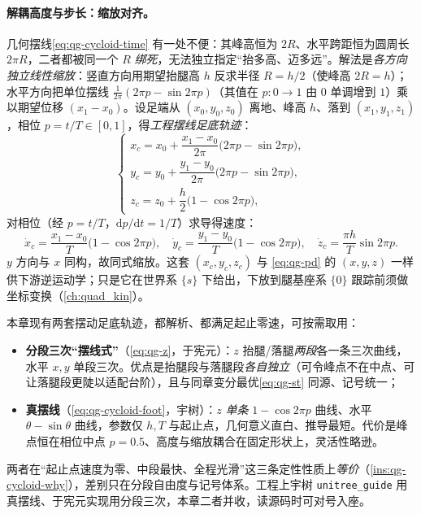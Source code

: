 \paragraph{解耦高度与步长：缩放对齐。}
几何摆线\cref{eq:qg-cycloid-time} 有一处不便：其峰高恒为 $2R$、水平跨距恒为圆周长 $2\pi R$，二者都被同一个 $R$ \emph{绑死}，无法独立指定“抬多高、迈多远”\cite{unitree2023quadruped}。解法是\emph{各方向独立线性缩放}：竖直方向用期望抬腿高 $h$ 反求半径 $R=h/2$（使峰高 $2R=h$）；水平方向把单位摆线 $\tfrac{1}{2\pi}(2\pi p-\sin2\pi p)$（其值在 $p:0\to1$ 由 $0$ 单调增到 $1$）乘以期望位移 $(x_1-x_0)$。设足端从 $(x_0,y_0,z_0)$ 离地、峰高 $h$、落到 $(x_1,y_1,z_1)$，相位 $p=t/T\in[0,1]$，得\emph{工程摆线足底轨迹}\cite{unitree2023quadruped}：
\begin{equation}
  \begin{cases}
  x_c=x_0+\dfrac{x_1-x_0}{2\pi}\big(2\pi p-\sin2\pi p\big),\\[4pt]
  y_c=y_0+\dfrac{y_1-y_0}{2\pi}\big(2\pi p-\sin2\pi p\big),\\[4pt]
  z_c=z_0+\dfrac{h}{2}\big(1-\cos2\pi p\big),
  \end{cases}
  \label{eq:qg-cycloid-foot}
\end{equation}
对相位（经 $p=t/T$，$\mathrm{d}p/\mathrm{d}t=1/T$）求导得速度\cite{unitree2023quadruped}：
\begin{equation}
  \dot x_c=\frac{x_1-x_0}{T}\big(1-\cos2\pi p\big),
  \quad
  \dot y_c=\frac{y_1-y_0}{T}\big(1-\cos2\pi p\big),
  \quad
  \dot z_c=\frac{\pi h}{T}\sin2\pi p.
  \label{eq:qg-cycloid-foot-vel}
\end{equation}
$y$ 方向与 $x$ 同构，故同式缩放。这套 $(x_c,y_c,z_c)$ 与 \cref{eq:qg-pd} 的 $(x,y,z)$ 一样供下游逆运动学；只是它在世界系 $\{s\}$ 下给出，下放到腿基座系 $\{0\}$ 跟踪前须做坐标变换（\cref{ch:quad_kin}）\cite{unitree2023quadruped}。

\begin{note}\label{note:qg-two-swings}
本章现有两套摆动足底轨迹，都解析、都满足起止零速，可按需取用：
\begin{itemize}
  \item \textbf{分段三次“摆线式”}（\cref{eq:qg-z}，于宪元）：$z$ 抬腿/落腿\emph{两段}各一条三次曲线，水平 $x,y$ 单段三次。优点是抬腿段与落腿段\emph{各自独立}（可令峰点不在中点、可让落腿段更陡以适配台阶），且与同章变分最优\cref{eq:qg-st} 同源、记号统一；
  \item \textbf{真摆线}（\cref{eq:qg-cycloid-foot}，宇树）：$z$ \emph{单条} $1-\cos2\pi p$ 曲线、水平 $\theta-\sin\theta$ 曲线，参数仅 $h,T$ 与起止点，几何意义直白、推导最短。代价是峰点恒在相位中点 $p=0.5$、高度与缩放耦合在固定形状上，灵活性略逊。
\end{itemize}
两者在“起止点速度为零、中段最快、全程光滑”这三条定性性质上\emph{等价}（\cref{ins:qg-cycloid-why}），差别只在分段自由度与记号体系。工程上宇树 \texttt{unitree\_guide} 用真摆线、于宪元实现用分段三次，本章二者并收，读源码时可对号入座。
\end{note}

